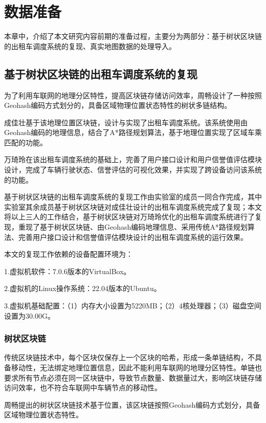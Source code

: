 \chapter{数据准备}
\label{chapter-Data}

\space 本章中，介绍了本文研究内容前期的准备过程，主要分为两部分：基于树状区块链的出租车调度系统的复现、真实地图数据的处理导入。

\section{基于树状区块链的出租车调度系统的复现}

为了利用车联网的地理分区特性，提高区块链存储访问效率，周畅设计了一种按照Geohash编码方式划分的，具备区域物理位置状态特性的树状多链结构\cite{s22228885}。

成佳壮基于该地理位置区块链，设计与实现了出租车调度系统。该系统使用由Geohash编码的地理信息，结合了A*路径规划算法，基于地理位置实现了区域车乘匹配的功能。

万琦玲在该出租车调度系统的基础上，完善了用户接口设计和用户信誉值评估模块设计，完成了车辆行驶状态、信誉评估的可视化效果，并实现了跨设备访问该系统的功能。

基于树状区块链的出租车调度系统的复现工作由实验室的成员一同合作完成，其中实验室其余成员基于树状区块链对成佳壮设计的出租车调度系统完成了复现；本文将以上三人的工作结合，基于树状区块链对万琦玲优化的出租车调度系统进行了复现，重现了基于树状区块链、由Geohash编码地理信息、采用传统A*路径规划算法、完善用户接口设计和信誉值评估模块设计的出租车调度系统的运行效果。

本文的复现工作依赖的设备配置环境为：

1.虚拟机软件：7.0.6版本的VirtualBox。

2.虚拟机的Linux操作系统：22.04版本的Ubuntu。

3.虚拟机基础配置：（1）内存大小设置为5220MB；（2）4核处理器；（3）磁盘空间设置为30.00G。

\subsection{树状区块链}

\space 传统区块链技术中，每个区块仅保存上一个区块的哈希，形成一条单链结构，不具备移动性，无法绑定地理位置信息，因此不能利用车联网的地理分区特性。单链也要求所有节点必须在同一区块链中，导致节点数量、数据量过大，影响区块链存储访问效率，也不符合车联网中车辆节点的移动性。

\space 周畅提出的树状区块链技术基于位置\cite{s22228885}，该区块链按照Geohash编码方式划分，具备区域物理位置状态特性。

